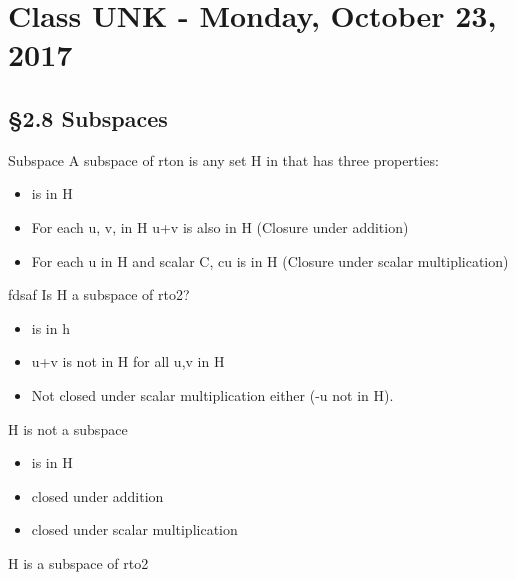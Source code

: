\chapter{Class UNK - Monday, October 23, 2017}
\section{\S 2.8 Subspaces}

\begin{imp:defn}{Subspace}{} A subspace of rton is any set H in  that has three properties:
\begin{itemize}
  \item  is in H
  \item For each u, v, in H u+v is also in H (Closure under addition)
  \item For each u in H and scalar C, cu is in H (Closure under scalar multiplication)
\end{itemize}
\end{imp:defn}
\begin{ex}
fdsaf
Is H a subspace of rto2?
\begin{itemize}
\item is in h \checkmark
\item u+v is not in H for all u,v in H
\item Not closed under scalar multiplication either (-u not in H).
\end{itemize}
H is not a subspace
\end{ex}
\begin{ex}
\begin{itemize}
    \item is in H \checkmark
    \item closed under addition \checkmark
    \item closed under scalar multiplication \checkmark
\end{itemize}
H is a subspace of rto2
\end{ex}
